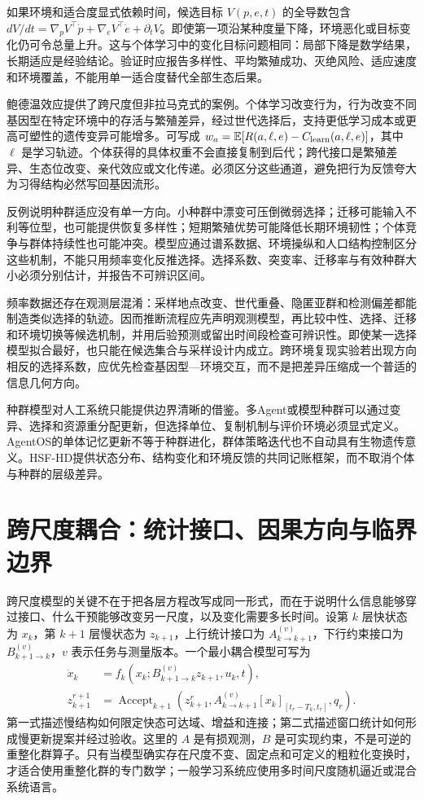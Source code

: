 如果环境和适合度显式依赖时间，候选目标 $V(p,e,t)$ 的全导数包含 $dV/dt=\nabla_pV^\top\dot p+\nabla_eV^\top\dot e+\partial_tV$。即使第一项沿某种度量下降，环境恶化或目标变化仍可令总量上升。这与个体学习中的变化目标问题相同：局部下降是数学结果，长期适应是经验结论。验证时应报告多样性、平均繁殖成功、灭绝风险、适应速度和环境覆盖，不能用单一适合度替代全部生态后果。

鲍德温效应提供了跨尺度但非拉马克式的案例。个体学习改变行为，行为改变不同基因型在特定环境中的存活与繁殖差异，经过世代选择后，支持更低学习成本或更高可塑性的遗传变异可能增多。可写成 $w_a=\mathbb E[R(a,\ell,e)-C_{\rm learn}(a,\ell,e)]$，其中 $\ell$ 是学习轨迹。个体获得的具体权重不会直接复制到后代；跨代接口是繁殖差异、生态位改变、亲代效应或文化传递。必须区分这些通道，避免把行为反馈夸大为习得结构必然写回基因流形。

反例说明种群适应没有单一方向。小种群中漂变可压倒微弱选择；迁移可能输入不利等位型，也可能提供恢复多样性；短期繁殖优势可能降低长期环境韧性；个体竞争与群体持续性也可能冲突。模型应通过谱系数据、环境操纵和人口结构控制区分这些机制，不能只用频率变化反推选择。选择系数、突变率、迁移率与有效种群大小必须分别估计，并报告不可辨识区间。

频率数据还存在观测层混淆：采样地点改变、世代重叠、隐匿亚群和检测偏差都能制造类似选择的轨迹。因而推断流程应先声明观测模型，再比较中性、选择、迁移和环境切换等候选机制，并用后验预测或留出时间段检查可辨识性。即使某一选择模型拟合最好，也只能在候选集合与采样设计内成立。跨环境复现实验若出现方向相反的选择系数，应优先检查基因型—环境交互，而不是把差异压缩成一个普适的信息几何方向。

种群模型对人工系统只能提供边界清晰的借鉴。多Agent或模型种群可以通过变异、选择和资源重分配更新，但选择单位、复制机制与评价环境必须显式定义。AgentOS的单体记忆更新不等于种群进化，群体策略迭代也不自动具有生物遗传意义。HSF-HD提供状态分布、结构变化和环境反馈的共同记账框架，而不取消个体与种群的层级差异。

\section{跨尺度耦合：统计接口、因果方向与临界边界}
\label{sec:hierarchical_coupling_rg_flow}

跨尺度模型的关键不在于把各层方程改写成同一形式，而在于说明什么信息能够穿过接口、什么干预能够改变另一尺度，以及变化需要多长时间。设第 $k$ 层快状态为 $x_k$，第 $k+1$ 层慢状态为 $z_{k+1}$，上行统计接口为 $A_{k\to k+1}^{(v)}$，下行约束接口为 $B_{k+1\to k}^{(v)}$，$v$ 表示任务与测量版本。一个最小耦合模型可写为
\begin{align}
 \dot x_k &= f_k(x_k;B_{k+1\to k}^{(v)}z_{k+1},u_k,t),\\
 z_{k+1}^{r+1} &= \operatorname{Accept}_{k+1}\!\left(z_{k+1}^{r},A_{k\to k+1}^{(v)}[x_k]_{[t_r-T_k,t_r]},q_r\right).
\end{align}
第一式描述慢结构如何限定快态可达域、增益和连接；第二式描述窗口统计如何形成慢更新提案并经过验收。这里的 $A$ 是有损观测，$B$ 是可实现约束，不是可逆的重整化群算子。只有当模型确实存在尺度不变、固定点和可定义的粗粒化变换时，才适合使用重整化群的专门数学；一般学习系统应使用多时间尺度随机逼近或混合系统语言。

